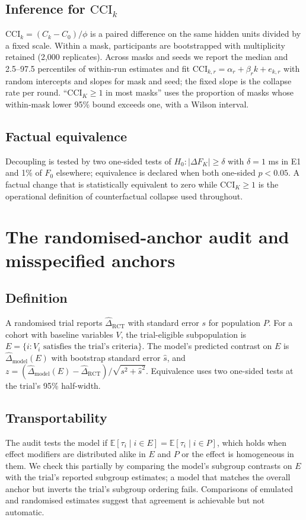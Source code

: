 \documentclass[11pt,a4paper]{article}
\newcommand{\Ex}{\mathbb E}
\newcommand{\CCI}{\mathrm{CCI}}
\begin{document}
\subsection{Inference for $\CCI_k$}
$\CCI_k=(C_k-C_0)/\phi$ is a paired difference on the same hidden units divided by a fixed scale. Within a mask, participants are bootstrapped with multiplicity retained (2,000 replicates). Across masks and seeds we report the median and 2.5--97.5 percentiles of within-run estimates and fit $\CCI_{k,r}=\alpha_r+\beta_r k+e_{k,r}$ with random intercepts and slopes for mask and seed; the fixed slope is the collapse rate per round. ``$\CCI_K\ge1$ in most masks'' uses the proportion of masks whose within-mask lower 95\% bound exceeds one, with a Wilson interval.
\subsection{Factual equivalence}
Decoupling is tested by two one-sided tests\cite{schuirmann1987tost} of $H_0:|\Delta F_K|\ge\delta$ with $\delta=1$ ms in E1 and 1\% of $F_0$ elsewhere; equivalence is declared when both one-sided $p<0.05$. A factual change that is statistically equivalent to zero while $\CCI_K\ge1$ is the operational definition of counterfactual collapse used throughout.

\section{The randomised-anchor audit and misspecified anchors}
\subsection{Definition}
A randomised trial reports $\hat\Delta_{\mathrm{RCT}}$ with standard error $s$ for population $P$. For a cohort with baseline variables $V$, the trial-eligible subpopulation is $E=\{i:V_i\text{ satisfies the trial's criteria}\}$. The model's predicted contrast on $E$ is $\hat\Delta_{\mathrm{model}}(E)$ with bootstrap standard error $\hat s$, and $z=(\hat\Delta_{\mathrm{model}}(E)-\hat\Delta_{\mathrm{RCT}})/\sqrt{s^2+\hat s^2}$. Equivalence uses two one-sided tests at the trial's 95\% half-width.
\subsection{Transportability}
The audit tests the model if $\Ex[\tau_i\mid i\in E]=\Ex[\tau_i\mid i\in P]$, which holds when effect modifiers are distributed alike in $E$ and $P$ or the effect is homogeneous in them\cite{pearl2014transport,dahabreh2020transport}. We check this partially by comparing the model's subgroup contrasts on $E$ with the trial's reported subgroup estimates; a model that matches the overall anchor but inverts the trial's subgroup ordering fails. Comparisons of emulated and randomised estimates suggest that agreement is achievable but not automatic\cite{rctduplicate2023}.
\end{document}
